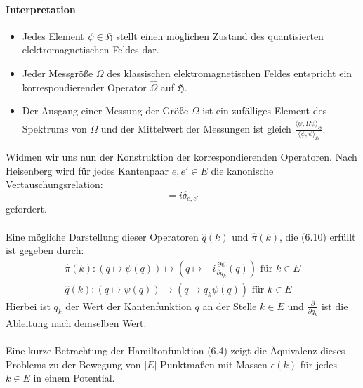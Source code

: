 \documentclass[11pt,a4paper,leqno]{report}
\numberwithin{equation}{chapter}
\begin{document}
\paragraph{Interpretation}
\begin{itemize}
\item Jedes Element $\psi\in\mathfrak{H}$ stellt einen m\"oglichen Zustand des quantisierten elektromagnetischen Feldes dar. 
\item Jeder Messgr\"o\ss{}e $\Omega$ des klassischen elektromagnetischen Feldes entspricht ein korrespondierender Operator $\hat{\Omega}$ auf $\mathfrak{H}$. 
\item Der Ausgang einer Messung der Gr\"o\ss{}e $\Omega$ ist ein zuf\"alliges Element des Spektrums von $\Omega$ und der Mittelwert der Messungen ist gleich $\frac{\langle \psi, \hat{\Omega}\psi\rangle_{\mathfrak{H}}}{\langle \psi, \psi\rangle_{\mathfrak{H}}}$.
\end{itemize}
\noindent
Widmen wir uns nun der Konstruktion der korrespondierenden Operatoren. Nach Heisenberg wird f\"ur jedes Kantenpaar $e,e'\in E$ die kanonische Vertauschungsrelation:
\begin{equation}
	[\hat{q}(e), \hat{\pi}(e')] = i\delta_{e, e'}
\end{equation}
gefordert.\\
\\
Eine m\"ogliche Darstellung dieser Operatoren $\hat{q}(k)$ und $\hat{\pi}(k)$, die (6.10) erf\"ullt ist gegeben durch:
\begin{align}
	\hat{\pi}(k):(q\mapsto\psi(q)) \mapsto (q\mapsto -i\frac{\partial\psi}{\partial q_k}(q))\text{  f\"ur }k\in E\\
	\hat{q}(k):(q\mapsto\psi(q)) \mapsto (q\mapsto q_k\psi(q))\text{  f\"ur }k\in E
\end{align}
\noindent
Hierbei ist $q_k$ der Wert der Kantenfunktion $q$ an der Stelle $k\in E$ und $\frac{\partial}{\partial q_k}$ ist die Ableitung nach demselben Wert.
\\
\\
Eine kurze Betrachtung der Hamiltonfunktion (6.4) zeigt die \"Aquivalenz dieses Problems zu der Bewegung von $|E|$ Punktma\ss{}en mit Massen $\epsilon(k)$ f\"ur jedes $k\in E$ in einem Potential. 
\end{document}
